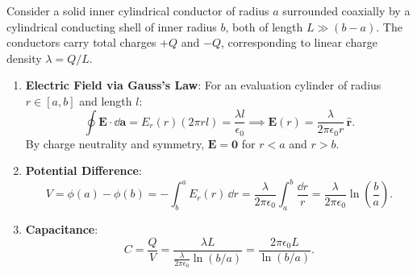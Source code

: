 \begin{example}
Consider a solid inner cylindrical conductor of radius \(a\) surrounded coaxially by a cylindrical conducting shell of inner radius \(b\), both of length \(L \gg (b - a)\). The conductors carry total charges \(+Q\) and \(-Q\), corresponding to linear charge density \(\lambda = Q/L\).

\begin{enumerate}
    \item \textbf{Electric Field via Gauss's Law}: For an evaluation cylinder of radius \(r \in [a, b]\) and length \(l\):
    \begin{equation}
        \oint \bm{E} \cdot \dd{\bm{a}} = E_r(r)(2\pi r l) = \frac{\lambda l}{\epsilon_0} \implies \bm{E}(r) = \frac{\lambda}{2\pi\epsilon_0 r}\,\hat{\bm{r}}.
    \end{equation}
    By charge neutrality and symmetry, \(\bm{E} = \bm{0}\) for \(r < a\) and \(r > b\).
    \item \textbf{Potential Difference}:
    \begin{equation}
        V = \phi(a) - \phi(b) = -\int_b^a E_r(r)\,\dd{r} = \frac{\lambda}{2\pi\epsilon_0} \int_a^b \frac{\dd{r}}{r} = \frac{\lambda}{2\pi\epsilon_0}\ln\left(\frac{b}{a}\right).
    \end{equation}
    \item \textbf{Capacitance}:
    \begin{equation}
        C = \frac{Q}{V} = \frac{\lambda L}{\frac{\lambda}{2\pi\epsilon_0}\ln(b/a)} = \frac{2\pi\epsilon_0 L}{\ln(b/a)}.
    \end{equation}
\end{enumerate}
\end{example}

